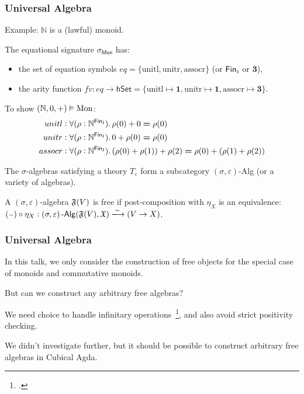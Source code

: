 \documentclass[9pt]{beamer}
\begin{document}
\begin{frame}
\frametitle{Universal Algebra}
Example: $\mathbb{N}$ is a (lawful) \alert{monoid}.

The equational signature $\sigma_{\mathsf{Mon}}$ has:
\begin{itemize}
    \item the set of \alert{equation symbols} $eq = \{\text{unitl}, \text{unitr}, \text{assocr}\}$
    (or $\Fin[3]$ or $\mathbf{3}$),
    \item the \alert{arity function}
    $fv : eq \rightarrow \mathsf{hSet} = \{\text{unitl} \mapsto \mathbf{1}, \text{unitr} \mapsto \mathbf{1}, \text{assocr} \mapsto \mathbf{3}\}$.
\end{itemize}

To show $(\mathbb{N},0,+) \vDash \text{Mon}$:
\begin{align*}
unitl  & : \forall (\rho : \Nat^{\Fin[1]}). \, \rho(0) + 0 \id \rho(0) \\
unitr  & : \forall (\rho : \Nat^{\Fin[1]}). \, 0 + \rho(0) \id \rho(0) \\
assocr & : \forall (\rho : \Nat^{\Fin[3]}). \, (\rho(0) + \rho(1)) + \rho(2) \id \rho(0) + (\rho(1) + \rho(2))
\end{align*} 

The $\sigma$-algebras satisfying a theory $T_{\varepsilon}$ form a subcategory $(\sigma,\varepsilon)$-Alg (or a variety of algebras).

\begin{dblock}
  A $(\sigma,\varepsilon)$-algebra $\mathfrak{F}(V)$ is free if post-composition with $\eta_X$ is an equivalence:
  $(\blank) \circ \eta_X : (\sigma,\varepsilon)\term{-Alg}(\str{F}(V),\str{X}) \xto{\sim} (V \to X)$.
\end{dblock}
\end{frame}

\begin{frame}
\frametitle{Universal Algebra}
In this talk, we only consider the construction of free objects for the special case of \alert{monoids} and \alert{commutative monoids}.

But can we construct any arbitrary free algebras?

  We need choice to handle infinitary operations~\footcite{blassWordsFreeAlgebras1983},
and also avoid strict positivity checking.

We didn't investigate further, but it should be possible to construct arbitrary free algebras
in Cubical Agda.

\end{frame}
\end{document}
